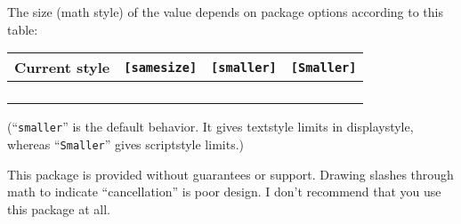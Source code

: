 \documentclass[pagesize=auto]{scrartcl}
\newcommand*{\cmd}[1]{\texttt{\string#1}}
\begin{document}
\begin{samepage}
  The size (math style) of the \cmd{\cancelto} value depends on package options 
  according to this table:
  \begin{center}
    \small
    \begin{tabular}{@{}llll@{}}
      \toprule
      \textbf{Current style}   & \textbf{\texttt{[samesize]}} & \textbf{\texttt{[smaller]}} & \textbf{\texttt{[Smaller]}} \\
      \midrule
      \cmd{\displaystyle}      & \cmd{\displaystyle}          & \cmd{\textstyle}            & \cmd{\scriptstyle}          \\
      \cmd{\textstyle}         & \cmd{\textstyle}             & \cmd{\scriptstyle}          & \cmd{\scriptstyle}          \\
      \cmd{\scriptstyle}       & \cmd{\scriptstyle}           & \cmd{\scriptscriptstyle}    & \cmd{\scriptscriptstyle}    \\
      \cmd{\scriptscriptstyle} & \cmd{\scriptscriptstyle}     & \cmd{\scriptscriptstyle}    & \cmd{\scriptscriptstyle}    \\
      \bottomrule
    \end{tabular}
  \end{center}
  (``\texttt{smaller}'' is the default behavior.  It gives textstyle limits in 
  displaystyle, whereas ``\texttt{Smaller}'' gives scriptstyle limits.)
\end{samepage}

This package is provided without guarantees or support.  Drawing slashes
through math to indicate ``cancellation'' is poor design.  I don't recommend
that you use this package at all.
\end{document}
